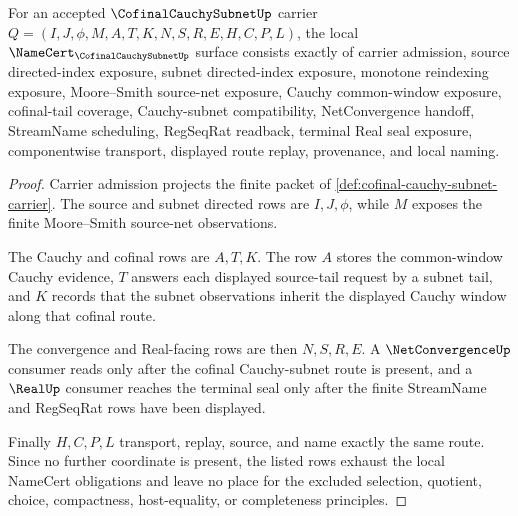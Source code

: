 \begin{theorem}
\label{thm:cofinal-cauchy-subnet-namecert-obligations}
For an accepted $\CofinalCauchySubnetUp$ carrier $Q=(I,J,\phi,M,A,T,K,N,S,R,E,H,C,P,L)$, the local $\NameCert_{\CofinalCauchySubnetUp}$ surface consists exactly of carrier admission, source directed-index exposure, subnet directed-index exposure, monotone reindexing exposure, Moore--Smith source-net exposure, Cauchy common-window exposure, cofinal-tail coverage, Cauchy-subnet compatibility, NetConvergence handoff, StreamName scheduling, RegSeqRat readback, terminal Real seal exposure, componentwise transport, displayed route replay, provenance, and local naming.
\end{theorem}
\begin{proof}
Carrier admission projects the finite packet of \autoref{def:cofinal-cauchy-subnet-carrier}. The source and subnet directed rows are $I,J,\phi$, while $M$ exposes the finite Moore--Smith source-net observations.

The Cauchy and cofinal rows are $A,T,K$. The row $A$ stores the common-window Cauchy evidence, $T$ answers each displayed source-tail request by a subnet tail, and $K$ records that the subnet observations inherit the displayed Cauchy window along that cofinal route.

The convergence and Real-facing rows are then $N,S,R,E$. A $\NetConvergenceUp$ consumer reads only after the cofinal Cauchy-subnet route is present, and a $\RealUp$ consumer reaches the terminal seal only after the finite StreamName and RegSeqRat rows have been displayed.

Finally $H,C,P,L$ transport, replay, source, and name exactly the same route. Since no further coordinate is present, the listed rows exhaust the local NameCert obligations and leave no place for the excluded selection, quotient, choice, compactness, host-equality, or completeness principles.
\end{proof}

